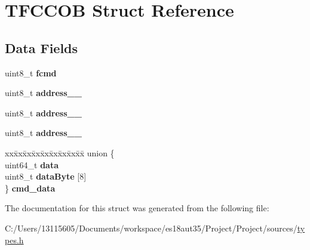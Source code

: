 \hypertarget{struct_t_f_c_c_o_b}{}\section{T\+F\+C\+C\+O\+B Struct Reference}
\label{struct_t_f_c_c_o_b}
\subsection*{Data Fields}
\begin{DoxyCompactItemize}
\item 
\hypertarget{struct_t_f_c_c_o_b_a3aaa2129c7543c763bb13c6af20a2219}{}uint8\+\_\+t {\bfseries fcmd}\label{struct_t_f_c_c_o_b_a3aaa2129c7543c763bb13c6af20a2219}

\item 
\hypertarget{struct_t_f_c_c_o_b_a5d77e70688a058583b8f28af19bcac08}{}uint8\+\_\+t {\bfseries address\+\_\+\_}\label{struct_t_f_c_c_o_b_a5d77e70688a058583b8f28af19bcac08}

\item 
\hypertarget{struct_t_f_c_c_o_b_a9819853a71cd0a83c648bd658da8f980}{}uint8\+\_\+t {\bfseries address\+\_\+\_}\label{struct_t_f_c_c_o_b_a9819853a71cd0a83c648bd658da8f980}

\item 
\hypertarget{struct_t_f_c_c_o_b_a1bb147f0296ef79a17c40c764ffd7ac4}{}uint8\+\_\+t {\bfseries address\+\_\+\_}\label{struct_t_f_c_c_o_b_a1bb147f0296ef79a17c40c764ffd7ac4}

\item 
\hypertarget{struct_t_f_c_c_o_b_af0c5b5b10662df721f5a41a535d446fd}{}\begin{tabbing}
xx\=xx\=xx\=xx\=xx\=xx\=xx\=xx\=xx\=\kill
union \{\\
\>uint64\_t {\bfseries data}\\
\>uint8\_t {\bfseries dataByte} \mbox{[}8\mbox{]}\\
\} {\bfseries cmd\_data}\label{struct_t_f_c_c_o_b_af0c5b5b10662df721f5a41a535d446fd}
\\

\end{tabbing}\end{DoxyCompactItemize}


The documentation for this struct was generated from the following file\+:\begin{DoxyCompactItemize}
\item 
C\+:/\+Users/13115605/\+Documents/workspace/es18aut35/\+Project/\+Project/sources/\hyperlink{types_8h}{types.\+h}\end{DoxyCompactItemize}

